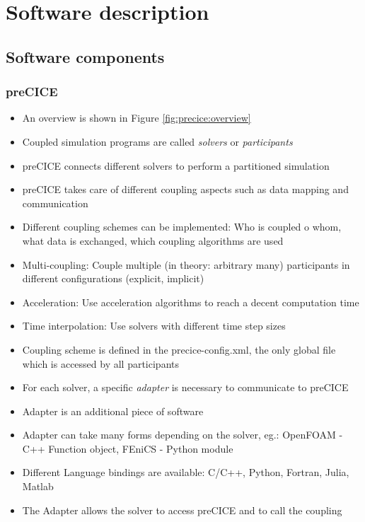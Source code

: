 \section{Software description}
\label{section:software}

\subsection{Software components}

\subsubsection{preCICE}
\begin{itemize}
	\item An overview is shown in Figure \ref{fig:precice:overview}
	\item Coupled simulation programs are called \textit{solvers} or \textit{participants}
	\item preCICE connects different solvers to perform a partitioned simulation
	\item preCICE takes care of different coupling aspects such as data mapping and communication
	\item Different coupling schemes can be implemented: Who is coupled o whom, what data is exchanged, which coupling algorithms are used \cite{Gatzhammer:2014}
	\item Multi-coupling: Couple multiple (in theory: arbitrary many) participants in different configurations (explicit, implicit)
	\item Acceleration: Use acceleration algorithms to reach a decent computation time
	\item Time interpolation: Use solvers with different time step sizes
	\item Coupling scheme is defined in the precice-config.xml, the only global file which is accessed by all participants
	\item For each solver, a specific \textit{adapter} is necessary to communicate to preCICE
	\item Adapter is an additional piece of software
	\item Adapter can take many forms depending on the solver, eg.: OpenFOAM - C++ Function object, FEniCS - Python module
	\item Different Language bindings are available: C/C++, Python, Fortran, Julia, Matlab
	\item The Adapter allows the solver to access preCICE and to call the coupling
\end{itemize}

